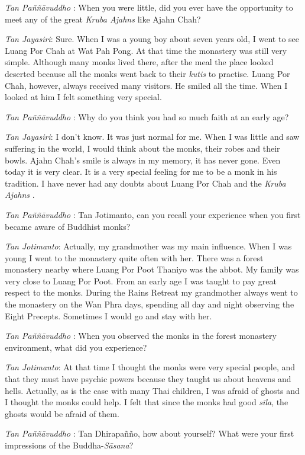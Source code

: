 \emph{Tan Paññāvuddho} : When you were little, did you ever have the
opportunity to meet any of the great \emph{Kruba Ajahns  } like Ajahn
Chah?

\emph{Tan Jayasiri}: Sure. When I was a young boy about seven years old,
I went to see Luang Por Chah at Wat Pah Pong. At that time the monastery
was still very simple. Although many monks lived there, after the meal
the place looked deserted because all the monks went back to their
\emph{kutis} to practise. Luang Por Chah, however, always received many
visitors. He smiled all the time. When I looked at him I felt something
very special.

\emph{Tan Paññāvuddho} : Why do you think you had so much faith at an
early age?

\emph{Tan Jayasiri}: I don't know. It was just normal for me. When I was
little and saw suffering in the world, I would think about the monks,
their robes and their bowls. Ajahn Chah's smile is always in my memory,
it has never gone. Even today it is very clear. It is a very special
feeling for me to be a monk in his tradition. I have never had any
doubts about Luang Por Chah and the \emph{Kruba Ajahns  }.

\emph{Tan Paññāvuddho} : Tan Jotimanto, can you recall your experience
when you first became aware of Buddhist monks?

\emph{Tan Jotimanto}: Actually, my grandmother was my main influence.
When I was young I went to the monastery quite often with her. There was
a forest monastery nearby where Luang Por Poot Thaniyo was the abbot. My
family was very close to Luang Por Poot. From an early age I was taught
to pay great respect to the monks. During the Rains Retreat my
grandmother always went to the monastery on the Wan Phra days, spending
all day and night observing the Eight Precepts. Sometimes I would go and
stay with her.

\emph{Tan Paññāvuddho} : When you observed the monks in the forest
monastery environment, what did you experience?

\emph{Tan Jotimanto}: At that time I thought the monks were very special
people, and that they must have psychic powers because they taught us
about heavens and hells. Actually, as is the case with many Thai
children, I was afraid of ghosts and I thought the monks could help. I
felt that since the monks had good \emph{sīla}, the ghosts would be
afraid of them.

\emph{Tan Paññāvuddho} : Tan Dhirapañño, how about yourself? What were
your first impressions of the Buddha-\emph{Sāsana}?

